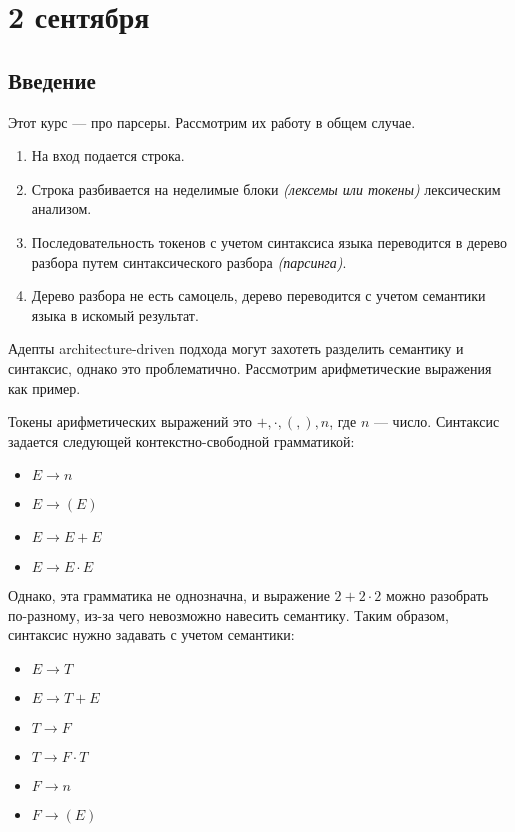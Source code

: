 \chapter{2 сентября}

\section{Введение}

Этот курс --- про парсеры. Рассмотрим их работу в общем случае.

\begin{enumerate}
    \item На вход подается строка.
    \item Строка разбивается на неделимые блоки \textit{(лексемы или токены)} лексическим анализом.
    \item Последовательность токенов с учетом синтаксиса языка переводится в дерево разбора путем синтаксического разбора \textit{(парсинга)}.
    \item Дерево разбора не есть самоцель, дерево переводится с учетом семантики языка в искомый результат.
\end{enumerate}

Адепты architecture-driven подхода могут захотеть разделить семантику и синтаксис, однако это проблематично. Рассмотрим арифметические выражения как пример.

Токены арифметических выражений это \( + , \cdot, (, ), n\), где \(n\) --- число. Синтаксис задается следующей контекстно-свободной грамматикой:
\begin{itemize}
    \item \(E \to n\) 
    \item \(E \to (E)\)
    \item \(E \to E + E\)
    \item \(E \to E \cdot E\)
\end{itemize}

Однако, эта грамматика не однозначна, и выражение \(2 + 2 \cdot 2\) можно разобрать по-разному, из-за чего невозможно навесить семантику. Таким образом, синтаксис нужно задавать с учетом семантики:
\begin{itemize}
    \item \(E \to T\)
    \item \(E \to T + E\)
    \item \(T \to F\)
    \item \(T \to F \cdot T\)
    \item \(F \to n\)
    \item \(F \to (E)\)
\end{itemize}

